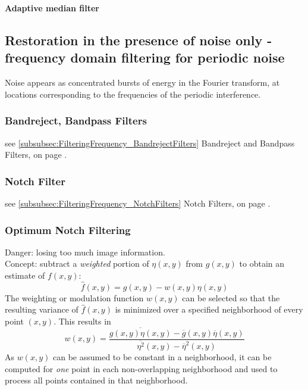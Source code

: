 \textbf{Adaptive median filter }\\


\subsection{Restoration in the presence of noise only - frequency domain filtering for periodic noise }
Noise appears as concentrated bursts of energy in the Fourier transform, at locations corresponding to the frequencies of the periodic interference.

\subsubsection{Bandreject, Bandpass Filters }
see \ref{subsubsec:FilteringFrequency_BandrejectFilters} Bandreject and Bandpass Filters, on page \pageref{subsubsec:FilteringFrequency_BandrejectFilters}.

\subsubsection{Notch Filter }
see \ref{subsubsec:FilteringFrequency_NotchFilters} Notch Filters, on page \pageref{subsubsec:FilteringFrequency_NotchFilters}.

\subsubsection{Optimum Notch Filtering }
Danger: losing too much image information. \\
Concept: subtract a \textit{weighted} portion of $\eta(x,y)$ from $g(x,y)$ to obtain an estimate of $f(x,y)$:
\begin{equation}
	\hat{f}(x,y) = g(x,y) - w(x,y) \eta(x,y)
\end{equation}
The weighting or modulation function $w(x,y)$ can be selected so that the resulting variance of $\hat{f}(x,y)$ is minimized over a specified neighborhood of every point $(x,y)$. This results in
\begin{equation}
	w(x,y) = \frac{\overline{g(x,y) \eta(x,y)} - \overline{g}(x,y)\overline{\eta}(x,y)}{\overline{\eta^2}(x,y) - \overline{\eta}^2(x,y)}
\end{equation}
As $w(x,y)$ can be assumed to be constant in a neighborhood, it can be computed for \textit{one} point in each non-overlapping neighborhood and used to process all points contained in that neighborhood.

